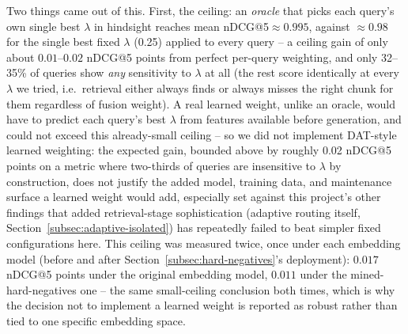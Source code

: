 \documentclass[a4paper,twoside]{article}
\begin{document}
Two things came out of this. First, the ceiling: an \emph{oracle} that picks each query's own single best $\lambda$ in hindsight reaches mean nDCG@5$\approx0.995$, against $\approx0.98$ for the single best fixed $\lambda$ (0.25) applied to every query -- a ceiling gain of only about $0.01$--$0.02$ nDCG@5 points from perfect per-query weighting, and only 32--35\% of queries show \emph{any} sensitivity to $\lambda$ at all (the rest score identically at every $\lambda$ we tried, i.e.\ retrieval either always finds or always misses the right chunk for them regardless of fusion weight). A real learned weight, unlike an oracle, would have to predict each query's best $\lambda$ from features available before generation, and could not exceed this already-small ceiling -- so we did not implement DAT-style learned weighting: the expected gain, bounded above by roughly 0.02 nDCG@5 points on a metric where two-thirds of queries are insensitive to $\lambda$ by construction, does not justify the added model, training data, and maintenance surface a learned weight would add, especially set against this project's other findings that added retrieval-stage sophistication (adaptive routing itself, Section~\ref{subsec:adaptive-isolated}) has repeatedly failed to beat simpler fixed configurations here. This ceiling was measured twice, once under each embedding model (before and after Section~\ref{subsec:hard-negatives}'s deployment): $0.017$ nDCG@5 points under the original embedding model, $0.011$ under the mined-hard-negatives one -- the same small-ceiling conclusion both times, which is why the decision not to implement a learned weight is reported as robust rather than tied to one specific embedding space.
\end{document}
